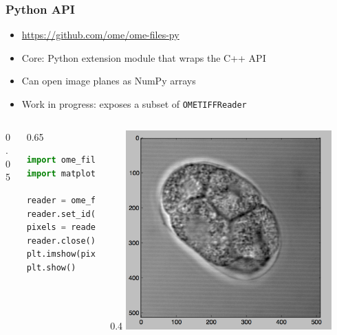 \documentclass{beamer}
\begin{document}
\begin{frame}[fragile]
  \frametitle{Python API}

  \begin{itemize}
  \item \url{https://github.com/ome/ome-files-py}
  \item Core: Python extension module that wraps the C++ API
  \item Can open image planes as NumPy arrays
  \item Work in progress: exposes a subset of \texttt{OMETIFFReader}
  \end{itemize}
  \begin{columns}
    \begin{column}{0.05\textwidth}
    \end{column}
    \begin{column}{0.65\textwidth}
      \centering
      \begin{lstlisting}[language=Python]
import ome_files
import matplotlib.pyplot as plt

reader = ome_files.OMETIFFReader()
reader.set_id("tubhiswt_C0.ome.tif")
pixels = reader.open_array(0)
reader.close()
plt.imshow(pixels, cmap="gray")
plt.show()
      \end{lstlisting}
    \end{column}
    \begin{column}{0.4\textwidth}
      \centering
      \includegraphics[width=0.85\textwidth]{figures/openbytes.png}
    \end{column}
  \end{columns}
\end{frame}
\end{document}
